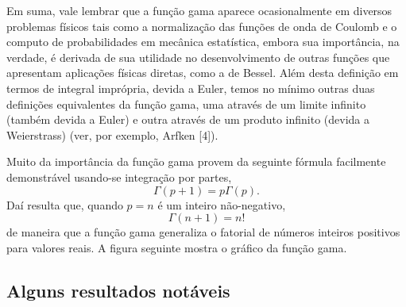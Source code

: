 Em suma, vale lembrar que a função gama aparece ocasionalmente em diversos problemas físicos tais como a normalização das funções de onda de Coulomb e o computo de probabilidades em mecânica estatística, embora sua importância, na verdade, é derivada de sua utilidade no desenvolvimento de outras funções que apresentam aplicações físicas diretas, como a de Bessel. Além desta definição em termos de integral imprópria, devida a Euler, temos no mínimo outras duas definições equivalentes da função gama, uma através de um limite infinito (também devida a Euler) e outra através de um produto infinito (devida a Weierstrass) (ver, por exemplo, Arfken [4]).

Muito da importância da função gama provem da seguinte fórmula facilmente demonstrável
usando-se integração por partes,
$$\Gamma(p+1) = p\Gamma(p).$$
Daí resulta que, quando $p = n$ é um inteiro não-negativo,
$$\Gamma(n+1) = n!$$
de maneira que a função gama generaliza o fatorial de números inteiros positivos para valores reais. A figura seguinte mostra o gráfico da função gama.




\subsection*{Alguns resultados notáveis}







